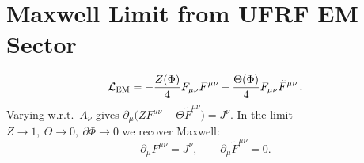 
\section*{Maxwell Limit from UFRF EM Sector}
\[
\mathcal{L}_{\rm EM} = -\frac{Z(\Phi)}{4}F_{\mu\nu}F^{\mu\nu}
-\frac{\Theta(\Phi)}{4}F_{\mu\nu}\tilde F^{\mu\nu}\,.
\]
Varying w.r.t.\ $A_\nu$ gives $\partial_\mu\!\big(ZF^{\mu\nu}+\Theta\tilde F^{\mu\nu}\big)=J^\nu$.
In the limit $Z\!\to\!1,\ \Theta\!\to\!0,\ \partial\Phi\!\to\!0$ we recover Maxwell:
\[
\partial_\mu F^{\mu\nu} = J^\nu,\qquad \partial_\mu \tilde F^{\mu\nu}=0.
\]
